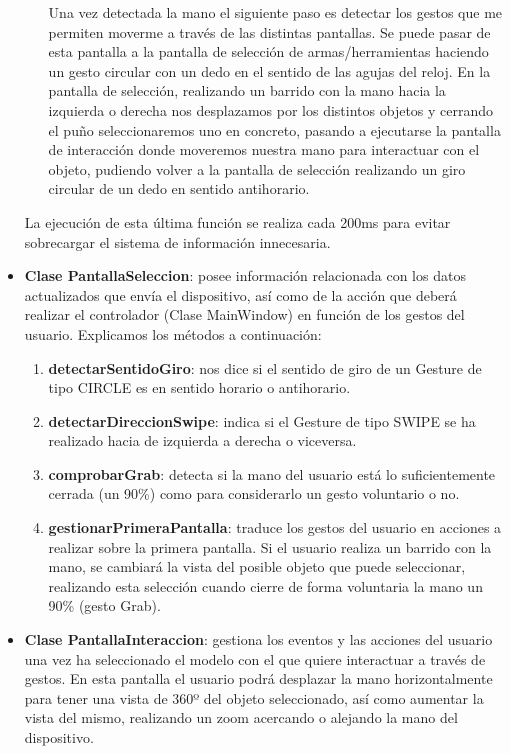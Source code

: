 \begin{itemize}
\begin{enumerate}
			Una vez detectada la mano el siguiente paso es detectar los gestos que me permiten moverme a través de las distintas pantallas. Se puede pasar de esta pantalla a la pantalla de selección de armas/herramientas haciendo un gesto circular con un dedo en el sentido de las agujas del reloj. En la pantalla de selección, realizando un barrido con la mano hacia la izquierda o derecha nos desplazamos por los distintos objetos y cerrando el puño seleccionaremos uno en concreto, pasando a ejecutarse la pantalla de interacción donde moveremos nuestra mano para interactuar con el objeto, pudiendo volver a la pantalla de selección realizando un giro circular de un dedo en sentido antihorario.
		\end{enumerate}	
	
		La ejecución de esta última función se realiza cada 200ms para evitar sobrecargar el sistema de información innecesaria.
	
	\item \textbf{Clase PantallaSeleccion}: posee información relacionada con los datos actualizados que envía el dispositivo, así como de la acción que deberá realizar el controlador (Clase MainWindow) en función de los gestos del usuario. Explicamos los métodos a continuación:
		\begin{enumerate}
			\item \textbf{detectarSentidoGiro}: nos dice si el sentido de giro de un Gesture de tipo CIRCLE es en sentido horario o antihorario.
			
			\item \textbf{detectarDireccionSwipe}: indica si el Gesture de tipo SWIPE se ha realizado hacia de izquierda a derecha o viceversa.
			
			\item \textbf{comprobarGrab}: detecta si la mano del usuario está lo suficientemente cerrada (un 90\%) como para considerarlo un gesto voluntario o no.
			
			\item \textbf{gestionarPrimeraPantalla}: traduce los gestos del usuario en acciones a realizar sobre la primera pantalla. Si el usuario realiza un barrido con la mano, se cambiará la vista del posible objeto que puede seleccionar, realizando esta selección cuando cierre de forma voluntaria la mano un 90\% (gesto Grab).
		\end{enumerate}
	
	\item \textbf{Clase PantallaInteraccion}: gestiona los eventos y las acciones del usuario una vez ha seleccionado el modelo con el que quiere interactuar a través de gestos. En esta pantalla el usuario podrá desplazar la mano horizontalmente para tener una vista de 360º del objeto seleccionado, así como aumentar la vista del mismo, realizando un zoom acercando o alejando la mano del dispositivo. 
	

\end{itemize}

